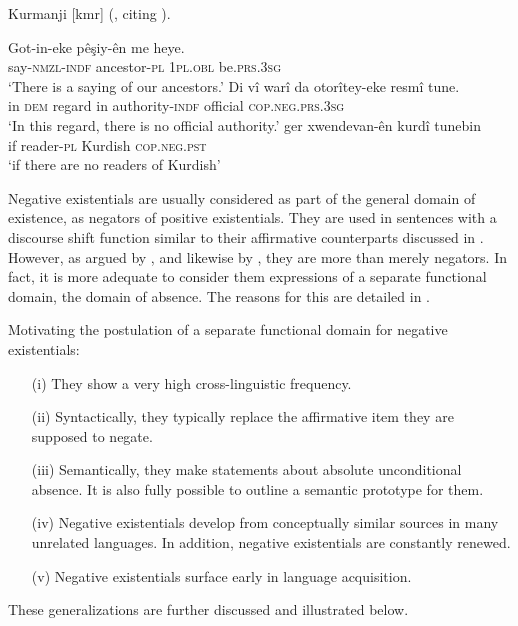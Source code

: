 \documentclass[output=paper,chinesefont,colorlinks,citecolor=brown]{langscibook}
\begin{document}
\begin{exe}
\ex Kurmanji [kmr] (, citing \citealt[31--32]{Thackston2006}).\label{ex:kurmanji-1}
\begin{xlist}
\ex \label{ex:kurmanji-1a}
\gll Got-in-eke pêşiy-ên me heye. \\
say-\textsc{nmzl}-\textsc{indf}   ancestor-\textsc{pl} \textsc{1pl}.\textsc{obl}   be.\textsc{prs.3sg}\\
    \glt `There is a saying of our ancestors.'
\ex \label{ex:kurmanji-1b}
\gll Di vî warî    da otorîtey-eke resmî   tune.  \\
in  \textsc{dem}    regard in  authority-\textsc{indf}  official \textsc{cop.neg.prs.3sg} \\
\glt `In this regard, there is no official authority.'
\ex \label{ex:kurmanji-1c}
\gll ger xwendevan-ên kurdî tunebin \\
if reader-\textsc{pl} Kurdish  \textsc{cop.neg.pst} \\
    \glt `if there are no readers of Kurdish'
\end{xlist}
\end{exe}
Negative existentials are usually considered as part of the general domain of existence, as negators of positive existentials. They are used in sentences with a discourse shift function similar to their affirmative counterparts discussed in . However, as argued by \citet[139]{Veselinova2013}, and likewise by \textcitetv[\pageref{sec:odam-exneg}]{chapters/O_dam-Everdell-GarciaSalido}, they are more than merely negators. In fact,  it is more adequate  to consider them expressions of a separate functional domain, the domain of absence. The reasons for this are detailed in .

\begin{exe}
\ex Motivating the postulation of a separate functional domain for negative existentials:\label{ex:negex-own domain}
\begin{enumerate}
    \item[(i)] They show a very high cross-linguistic frequency.
    \item[(ii)] Syntactically, they typically replace the affirmative item they are supposed to negate.
    \item[(iii)] Semantically, they make statements about absolute unconditional absence. It is also fully possible to outline a semantic prototype for them.
    \item[(iv)] Negative existentials develop from conceptually similar sources in many unrelated languages. In addition, negative existentials are constantly renewed.
    \item[(v)] Negative existentials surface early in language acquisition.
\end{enumerate}
\end{exe}
These generalizations are further discussed and illustrated below.
\end{document}

